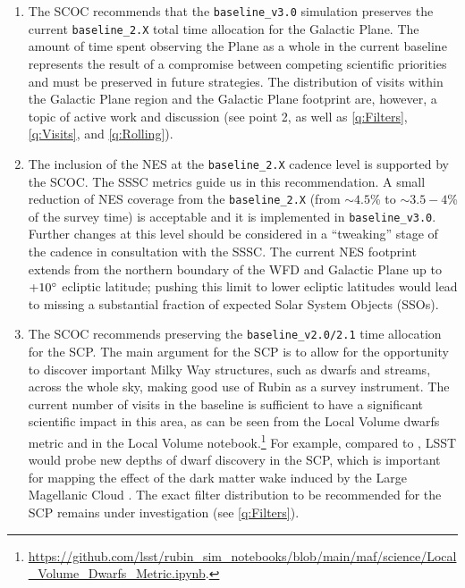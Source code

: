 \begin{enumerate}
\item 
The SCOC recommends that the \texttt{baseline\_v3.0} simulation preserves the current \texttt{baseline\_2.X} total time allocation for the Galactic Plane. The amount of time spent observing the Plane as a whole in the current baseline represents the result of a compromise between competing scientific priorities and must be preserved in future strategies.  
The distribution of visits within the Galactic Plane region and the Galactic Plane footprint are, however, a topic of active work and discussion (see point 2, as well as \autoref{q:Filters}, \autoref{q:Visits}, and \autoref{q:Rolling}).




\item The inclusion of the NES at the \texttt{baseline\_2.X} cadence level is supported by the SCOC. The SSSC metrics guide us in this recommendation.  A small reduction of NES coverage from the \texttt{baseline\_2.X} (from $\sim4.5$\% to $\sim3.5-4$\% of the survey time) is acceptable and it is implemented in \texttt{baseline\_v3.0}. Further changes at this level should be considered in a ``tweaking'' stage of the cadence in consultation with the SSSC. The current NES footprint extends from the northern boundary of the WFD and Galactic Plane up to $+ 10^{\circ}$ ecliptic latitude; pushing this limit to lower ecliptic latitudes would lead to missing a substantial fraction of expected Solar System Objects (SSOs).

\item The SCOC recommends preserving the \texttt{baseline\_v2.0/2.1} time allocation for the SCP.
The main argument for the SCP is to allow for the opportunity to discover important Milky Way structures, such as dwarfs and streams, across the whole sky, making good use of Rubin as a survey instrument.  The current number of visits in the baseline is sufficient to have a significant scientific impact in this area, as can be seen from the Local Volume dwarfs metric and in the Local Volume notebook.\footnote{\url{https://github.com/lsst/rubin_sim_notebooks/blob/main/maf/science/Local_Volume_Dwarfs_Metric.ipynb}.} For example, compared to \citet{simon2019faintest}, LSST would probe new depths of dwarf discovery in the SCP, which is important for mapping the effect of the dark matter wake induced by the Large Magellanic Cloud \citep{garavito2021quantifying}. The exact filter distribution to be recommended for the SCP remains under investigation (see \autoref{q:Filters}).


\end{enumerate}
